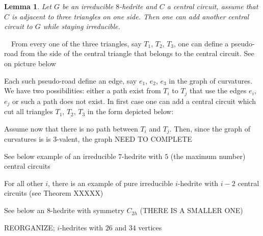 \documentclass[12pt]{article}
\newtheorem{lemma}{Lemma}
\newcommand{\proof}{\noindent{\bf Proof.}\ \ }
\begin{document}
\begin{lemma}
Let $G$ be an irreducible $8$-hedrite and $C$ a central circuit, assume that $C$ is adjacent to three triangles on one side. Then one can add another central circuit to $G$ while staying irreducible.
\end{lemma}
\proof From every one of the three triangles, say $T_1$, $T_2$, $T_3$, one can define a pseudo-road from the side of the central triangle that belongs to the central circuit. See on picture below
\begin{center}
\epsfxsize=40mm
\end{center}
Each such pseudo-road define an edge, say $e_1$, $e_2$, $e_3$ in the graph 
of curvatures. We have two possibilities: either a path exist from $T_i$ 
to $T_j$ that use the edges $e_i$, $e_j$ or such a path does not exist. In 
first case one can add a central circuit which cut all triangles $T_1$, 
$T_2$, $T_3$ in the form depicted below:
\begin{center}
\epsfxsize=40mm
\end{center}

Assume now that there is no path between $T_i$ and $T_j$. Then, since the graph of curvatures is is $3$-valent, the graph NEED TO COMPLETE













See below example of an irreducible $7$-hedrite with $5$ (the maximum number) central circuits

\begin{center}
\epsfxsize=60mm
\end{center}

For all other $i$, there is an example of pure irreducible $i$-hedrite with $i-2$ central circuits (see Theorem XXXXX)




See below an $8$-hedrite with symmetry $C_{2h}$ (THERE IS A SMALLER ONE)

REORGANIZE; $i$-hedrites with $26$ and $34$ vertices


\begin{center}
\epsfxsize=60mm
\end{center}
\end{document}
